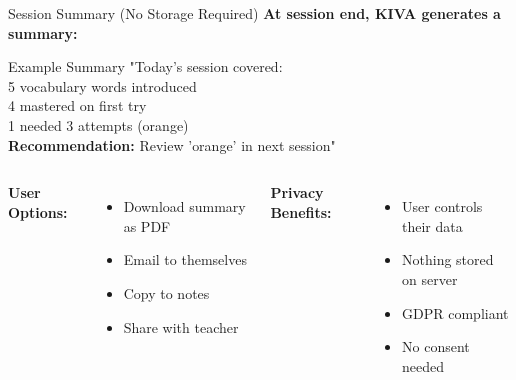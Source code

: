 \documentclass[aspectratio=169]{beamer}
\begin{document}
\begin{frame}{Session Summary (No Storage Required)}
\textbf{At session end, KIVA generates a summary:}

\vspace{0.3cm}

\begin{block}{Example Summary}
\small
"Today's session covered:\\
\quad \checkmark{} 5 vocabulary words introduced\\
\quad \checkmark{} 4 mastered on first try\\
\quad \checkmark{} 1 needed 3 attempts (orange)\\[0.2cm]
\textbf{Recommendation:} Review 'orange' in next session"
\end{block}

\vspace{0.3cm}

\begin{columns}[T]
\textbf{User Options:}
\begin{itemize}
    \item Download summary as PDF
    \item Email to themselves
    \item Copy to notes
    \item Share with teacher
\end{itemize}

\textbf{Privacy Benefits:}
\begin{itemize}
    \item User controls their data
    \item Nothing stored on server
    \item GDPR compliant
    \item No consent needed
\end{itemize}
\end{columns}
\end{frame}
\end{document}
